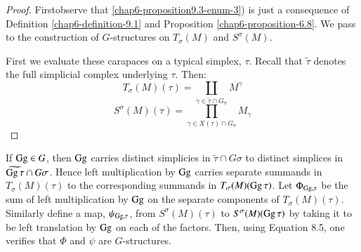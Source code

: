 \begin{proof}
First\pageoriginale observe that \ref{chap6-proposition9.3-enum-3}) is just a consequence of Definition \ref{chap6-definition-9.1} and Proposition \ref{chap6-proposition-6.8}. We pass to the construction of $G$-structures on $T_{\sigma}(M)$ and $S^{\sigma}(M)$.

First we evaluate these carapaces on a typical simplex, $\tau$. Recall that $\tilde{\tau}$ denotes the full simplicial complex underlying $\tau$. Then:
$$
T_{\sigma}(M)(\tau) = \coprod_{\gamma \in \tilde{\tau}\cap G_{\sigma}}M^{\gamma}
$$
\begin{equation*}\label{chap6-eq-9.4}
S^{\sigma}(M)(\tau) = \prod_{\gamma \in X (\tau) \cap G_{\sigma}} M_{\gamma}\tag{9.4}
\end{equation*}
\end{proof}

If $\operatorname{Gg} \in G$, then $\operatorname{Gg}$ carries distinct simplicies in $\tilde{\tau} \cap G\sigma$ to distinct simplices in $\widetilde{\operatorname{Gg} \tau}\cap G\sigma$. Hence left multiplication by $\operatorname{Gg}$ carries separate summands in $T_{\sigma}(M)(\tau)$ to the corresponding summands in $T_{\sigma}(M)(\operatorname{Gg} \tau)$. Let $\Phi_{\operatorname{Gg}, \tau}$ be the sum of left multiplication by $\operatorname{Gg}$ on the separate components of $T_{\sigma}(M)(\tau)$. Similarly define a map, $\psi_{\operatorname{Gg}, \tau}$, from $S^{\sigma}(M)(\tau)$ to $S^{\sigma}(M)(\operatorname{Gg} \tau)$ by taking it to be left translation by $\operatorname{Gg}$ on each of the factors. Then, using Equation 8.5, one verifies that $\Phi$ and $\psi$ are $G$-structures.


